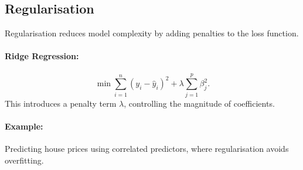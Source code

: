 \documentclass[12pt,a4paper]{article}
\begin{document}
\subsection{Regularisation}
Regularisation reduces model complexity by adding penalties to the loss function.

\paragraph{Ridge Regression:}
\[
\min \sum_{i=1}^n (y_i - \hat{y}_i)^2 + \lambda \sum_{j=1}^p \beta_j^2.
\]
This introduces a penalty term \( \lambda \), controlling the magnitude of coefficients.

\paragraph{Example:}
Predicting house prices using correlated predictors, where regularisation avoids overfitting.
\end{document}
